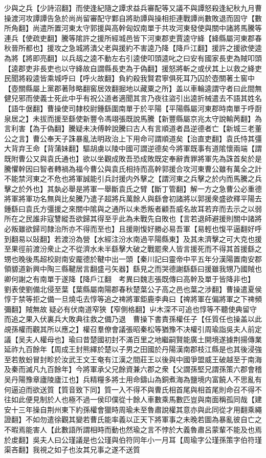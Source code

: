 少與之兵【少詩沼翻】而使逢紀隨之譚求益兵審配等又議不與譚怒殺逢紀秋九月曹操渡河攻譚譚告急於尚尚留審配守鄴自將助譚與操相拒連戰譚尚數敗退而固守【數所角翻】尚遣所置河東太守郭援與高幹匈奴南單于共攻河東發使與關中諸將馬騰等連兵【使疏吏翻】騰等隂許之援所經城邑皆下河東郡吏賈逵守絳【絳縣屬河東郡春秋晉所都也】援攻之急城將潰父老與援約不害逵乃降【降戶江翻】援許之援欲使逵為將【將即亮翻】以兵刼之逵不動左右引逵使叩頭逵叱之曰安有國家長吏為賊叩頭【逵郡吏非長吏也以守絳故自謂縣長吏為于偽翻】援怒將斬之或伏其上以救之絳吏民聞將殺逵皆乘城呼曰【呼火故翻】負約殺我賢君寧俱死耳乃囚於壺關著土窖中【壺關縣屬上黨郡著陟略翻窖居效翻掘地以藏粟之所】盖以車輪逵謂守者曰此間無健兒邪而使義士死此中乎有祝公道者適聞其言乃夜往盜引出逵折械遣去不語其姓名【語牛倨翻】曹操使司隸校尉鍾繇圍南單于於平陽【平陽縣屬河東郡時南單于呼㕑泉居之】未拔而援至繇使新豐令馮翊張既說馬騰【新豐縣屬京兆太守說輸苪翻】為言利害【為于偽翻】騰疑未决傅幹說騰曰古人有言順道者昌逆德者亡【新城三老董公之言】曹公奉天子誅暴亂法明政治上下用命可謂順道矣【治直吏翻】袁氏恃其彊大背弃王命【背蒲妹翻】驅胡虜以陵中國可謂逆德矣今將軍既事有道隂懷兩端【謂既附曹公又與袁氏通也】欲以坐觀成敗吾恐成敗既定奉辭責罪將軍先為誅首矣於是騰懼幹因曰智者轉禍為福今曹公與袁氏相持而高幹郭援合攻河東曹公雖有萬全之計不能禁河東之不危也將軍誠能引兵討援内外擊之【謂河東之兵擊之於内而馬騰之兵擊之於外也】其埶必舉是將軍一舉斷袁氏之臂【斷丁管翻】解一方之急曹公必重德將軍將軍功名無與比矣騰乃遣子超將兵萬餘人與繇會初諸將以郭援衆盛欲釋平陽去鍾繇曰袁氏方彊援之來關中隂與之通所以未悉叛者顧吾威名故耳若弃而去示之以弱所在之民誰非寇讐縱吾欲歸其得至乎此為未戰先自敗也【言若退師避援則關中諸將必叛雖欲歸司隸治所亦不得而至也】且援剛愎好勝必易吾軍【易輕也愎平逼翻好呼到翻易以䜴翻】若渡汾為營【水經注汾水南過平陽縣東】及其未濟擊之可大克也援至果徑前渡汾衆止之不從濟水未半繇擊大破之戰罷衆人皆言援死而不得其首援繇之甥也晚後馬超校尉南安龎德於鞬中出一頭【秦川記曰靈帝中平五年分漢陽置南安郡領䝠道新興中陶三縣鞬居言翻盛弓矢器】繇見之而哭德謝繇繇曰援雖我甥乃國賊也卿何謝之有南單于遂降【降戶江翻　考異曰魏志張既傳曰高幹及單于皆降非也】　劉表使劉備北侵至葉【葉縣屬南陽郡春秋楚葉公子高之邑也葉之涉翻】曹操遣夏侯惇于禁等拒之備一旦燒屯去惇等追之禆將軍鉅鹿李典曰【禆將軍在偏將軍之下禆頻彌翻】賊無故疑必有伏南道窄狹【窄側格翻】屮木深不可追也惇等不聽使典留守而追之果入伏裏兵大敗典往救之備乃退　曹操下書責孫權任子【任質任也操盖以此覘孫權而觀其所以應之】權召羣僚會議張昭秦松等猶豫不决權引周瑜詣吳夫人前定議【吴夫人權母也】瑜曰昔楚國初封不滿百里之地繼嗣賢能廣土開境遂據荆揚傳業延祚九百餘年【周成王封熊繹於楚以子男之田國於丹陽漢南郡枝江縣是也其後浸強至若敖蚡冒封畛於汝武王文王奄有江漢之間莊王以後與中國爭盟威王破越至于南海及秦而滅凡九百餘年】今將軍承父兄餘資兼六郡之衆【父謂孫堅兄謂孫策六郡會稽吴丹陽豫章廬陵廬江也】兵精糧多將士用命鑄山為銅煮海為鹽境内富饒人不思亂有何逼迫而欲送質【質音致下同】質一入不得不與曹氏相首尾與相首尾則命召不得不往如此便見制於人也極不過一侯印僕從十餘人車數乘馬數匹豈與南面稱孤同哉【建安十三年操自荆州東下約孫權會獵時周瑜未至魯肅說權其意亦與此同從才用翻乘繩證翻】不如勿遣徐觀其變若曹氏能率義以正天下將軍事之未晚若圖為暴亂彼自亡之不暇焉能害人【此數語所謂相時而動也然瑜之言不悖於大義魯肅呂蒙輩不能及也焉於䖍翻】吳夫人曰公瑾議是也公瑾與伯符同年小一月耳【周瑜字公瑾孫策字伯符瑾渠吝翻】我視之如子也汝其兄事之遂不送質

